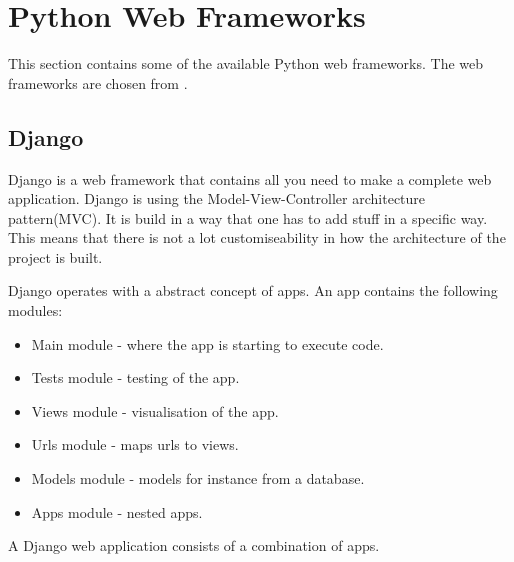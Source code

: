 \section{Python Web Frameworks}
This section contains some of the available Python web frameworks.
The web frameworks are chosen from \citet{python_web_frameworks_list}.

\subsection{Django}
Django\cite{django_cite} is a web framework that contains all you need to make a complete web application.
Django is using the Model-View-Controller architecture pattern(MVC)\cite{leff2001web}.
It is build in a way that one has to add stuff in a specific way.
This means that there is not a lot customiseability in how the architecture of the project is built.

Django operates with a abstract concept of apps.
An app contains the following modules:
\begin{itemize}
\item Main module - where the app is starting to execute code.
\item Tests module - testing of the app.
\item Views module - visualisation of the app.
\item Urls module - maps urls to views.
\item Models module - models for instance from a database.
\item Apps module - nested apps.
\end{itemize}
A Django web application consists of a combination of apps.

